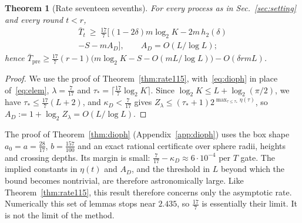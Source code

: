 \documentclass[aps,prx,twocolumn,superscriptaddress,nofootinbib,longbibliography]{revtex4-2}
\theoremstyle{plain}
\newtheorem{theorem}{Theorem}
\theoremstyle{definition}
\theoremstyle{remark}
\newcommand{\Tpre}{T_{\mathrm{pre}}}
\begin{document}
\begin{theorem}[Rate seventeen sevenths]\label{thm:rate177}
For every process as in Sec.~\ref{sec:setting} and every round $t<r$,
\begin{multline}\label{eq:rate177}
\bar T_t\ \ge\ \tfrac{17}7\big[(1-2\delta)m\log_2K-2m\,h_2(\delta)\\-S-mA_D\big],\qquad A_D=O(L/\log L);
\end{multline}
hence $\bar\Tpre\ge\tfrac{17}7(r-1)\big(m\log_2K-S-O(mL/\log L)\big)-O(\delta rmL)$.
\end{theorem}
\begin{proof}
We use the proof of Theorem~\ref{thm:rate115}, with~\eqref{eq:dioph} in place of~\eqref{eq:elem}, $\lambda=\tfrac7{17}$ and $\tau_*=\lceil\tfrac{17}7\log_2K\rceil$. Since $\log_2K\le L+\log_2(\pi/2)$, we have $\tau_*\le\tfrac{17}7(L+2)$, and $\kappa_D<\tfrac7{17}$ gives $Z_\lambda\le(\tau_*+1)2^{\max_{\tau\le\tau_*}\eta(\tau)}$, so $A_D:=1+\log_2Z_\lambda=O(L/\log L)$.
\end{proof}
The proof of Theorem~\ref{thm:dioph} (Appendix~\ref{app:dioph}) uses the box shape $a_0=a=\tfrac{28}{17}$, $b=\tfrac{157}{100}$ and an exact rational certificate over sphere radii, heights and crossing depths. Its margin is small: $\tfrac7{17}-\kappa_D\approx6\cdot10^{-4}$ per $T$ gate. The implied constants in $\eta(t)$ and $A_D$, and the threshold in $L$ beyond which the bound becomes nontrivial, are therefore astronomically large. Like Theorem~\ref{thm:rate115}, this result therefore concerns only the asymptotic rate. Numerically this set of lemmas stops near $2.435$, so $\tfrac{17}7$ is essentially their limit. It is not the limit of the method.
\end{document}
